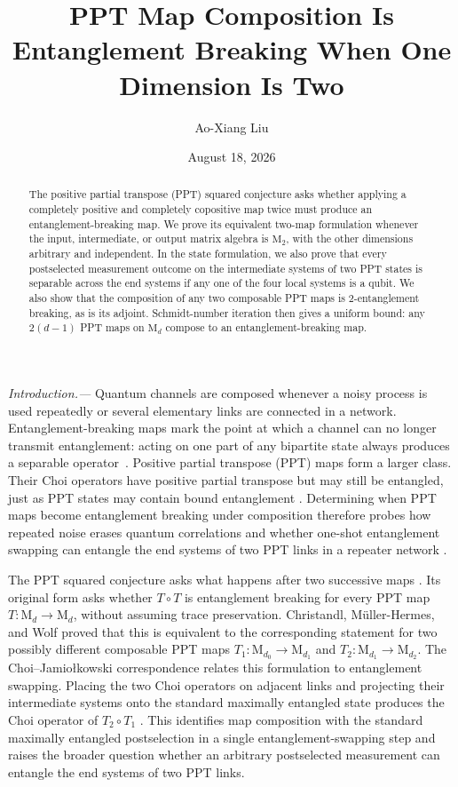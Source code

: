 \documentclass[aps,prl,reprint,superscriptaddress,nofootinbib]{revtex4-2}
\newcommand{\M}{\mathrm{M}}
\begin{document}
\title{PPT Map Composition Is Entanglement Breaking When One Dimension Is Two}
\author{Ao-Xiang Liu}
\date{August 18, 2026}

\begin{abstract}
The positive partial transpose (PPT) squared conjecture asks whether applying a
completely positive and completely copositive map twice must produce an
entanglement-breaking map.  We prove its equivalent two-map formulation
whenever the input, intermediate, or output matrix algebra is $\M_2$, with the
other dimensions arbitrary and independent.  In the state formulation, we
also prove that every postselected measurement outcome on the intermediate
systems of two PPT states is separable across the end systems if any one of
the four local systems is a qubit.  We also show that the composition of any
two composable PPT maps is 2-entanglement breaking, as is its adjoint.
Schmidt-number iteration then gives a uniform bound: any $2(d-1)$ PPT maps on
$\M_d$ compose to an entanglement-breaking map.
\end{abstract}

\maketitle

\textit{Introduction.---}
Quantum channels are composed whenever a noisy process is used repeatedly or
several elementary links are connected in a network.  Entanglement-breaking
maps mark the point at which a channel can no longer transmit entanglement:
acting on one part of any bipartite state always produces a separable
operator~\cite{Horodecki2003}.  Positive partial transpose (PPT) maps form a
larger class.  Their Choi operators have positive partial transpose but may
still be entangled, just as PPT states may contain bound entanglement
\cite{Horodecki1998}.  Determining when PPT maps become entanglement breaking
under composition therefore probes how repeated noise erases quantum
correlations and whether one-shot entanglement swapping can entangle the end
systems of two PPT links in a repeater network
\cite{Briegel1998,Bauml2015}.

The PPT squared conjecture asks what happens after two successive maps
\cite{Christandl2019}.  Its original form asks whether $T\circ T$ is
entanglement breaking for every PPT map $T:\M_d\to\M_d$, without assuming
trace preservation.  Christandl, M\"uller-Hermes, and Wolf proved that this
is equivalent to the corresponding statement for two possibly different
composable PPT maps $T_1:\M_{d_0}\to\M_{d_1}$ and
$T_2:\M_{d_1}\to\M_{d_2}$.  The Choi--Jamiołkowski correspondence relates
this formulation to entanglement swapping.  Placing the two Choi operators on
adjacent links and projecting their intermediate systems onto the standard
maximally entangled state produces the Choi operator of $T_2\circ T_1$
\cite{Singh2022,An2026}.  This identifies map composition with the standard
maximally entangled postselection in a single entanglement-swapping step and
raises the broader question whether an arbitrary postselected measurement can
entangle the end systems of two PPT links.
\end{document}
